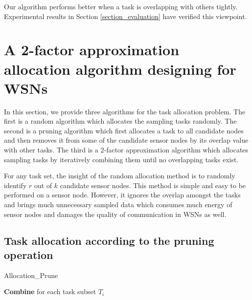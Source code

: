 \documentclass[prodmode,acmtosn]{acmsmall}
\begin{document}
Our algorithm performs better when a task is  overlapping with others tightly. Experimental results in Section \ref{section_evaluation} have verified this viewpoint.

\section{A 2-factor approximation allocation algorithm designing for WSNs}

\label{section_allocation}
In this section, we provide three algorithms for the task allocation problem. The first is a random algorithm which allocates the sampling tasks randomly. The second is a pruning algorithm which first allocates a task to all candidate nodes and then removes it from some of the candidate sensor nodes by its overlap value with other tasks.  The third is a $2$-factor approximation algorithm which allocates sampling tasks by iteratively combining them until no overlapping tasks exist.

For any task set, the insight of the random allocation method is to randomly identify $r$ out of $k$ candidate sensor nodes. This method is simple and easy to be performed on a sensor node. However, it ignores the overlap amongst the tasks and  brings much unnecessary sampled data which consumes much energy of sensor nodes and damages the quality of communication in WSNs as well.

\subsection{Task allocation according to the pruning operation}

\begin{algorithm}[t]
	\SetAlgoNoLine
    \caption{Allocation\_Prune}
    \label{allocation_prune}
        \textbf{Combine} for each task subset $T_i$\;
\end{algorithm}
\end{document}
